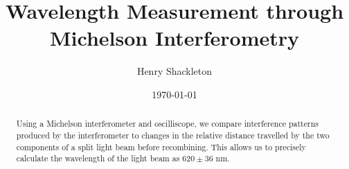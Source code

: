 \usepackage{graphicx}      %
\usepackage{lipsum}
\usepackage{float}
\usepackage{bm}            %
\usepackage[colorlinks=true]{hyperref}  %




\title{Wavelength Measurement through Michelson Interferometry}
\author{Henry Shackleton}
\date{\today}


\begin{abstract}
  Using a Michelson interferometer and oscilliscope, we compare interference patterns produced by the interferometer to changes in the relative distance travelled by the two components of a split light beam before recombining. This allows us to precisely calculate the wavelength of the light beam as $620 \pm 36$ nm.
\end{abstract}

\maketitle





